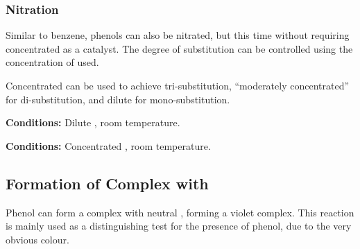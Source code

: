 
			\pagebreak

			\subsubsection{Nitration}

				Similar to benzene, phenols can also be nitrated, but this time without requiring concentrated  as a catalyst.
				The degree of substitution can be controlled using the concentration of  used.

				Concentrated  can be used to achieve tri-substitution, \enquote{moderately concentrated} for di-substitution, and
				dilute  for mono-substitution.

				\vspace{1.5em}
				\vbox{\textbf{Conditions:}	\tabto{35mm}Dilute , room temperature.}


				\vspace{1.5em}
				\vbox{\textbf{Conditions:}	\tabto{35mm}Concentrated , room temperature.}





		\pagebreak
		\subsection{Formation of Complex with }

			Phenol can form a complex with neutral , forming a violet complex. This reaction is mainly
			used as a distinguishing test for the presence of phenol, due to the very obvious colour.

